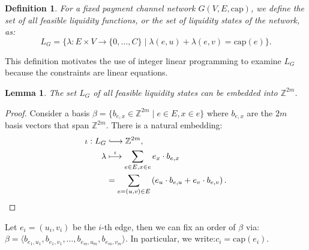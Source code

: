\documentclass[10pt,twocolumn]{article}
\newtheorem{definition}{Definition}[section]
\newtheorem{lemma}[theorem]{Lemma}
\newcommand{\longhookrightarrow}{\lhook\joinrel\longrightarrow}
\begin{document}


\begin{definition}
For a fixed payment channel network \( G(V,E, \text{cap}) \), we define the set of all feasible liquidity functions, or the set of liquidity states of the network, as:
\[ L_G = \{\lambda: E \times V \longrightarrow \{0, \dots, C\} \mid \lambda(e,u) + \lambda(e,v) = \text{cap}(e) \}. \]
\end{definition}
This definition motivates the use of integer linear programming to examine \(L_G\) because the constraints are linear equations.
\begin{lemma}
The set \( L_G \) of all feasible liquidity states can be embedded into \(\mathbb{Z}^{2m}\).
\end{lemma}

\begin{proof}
Consider a basis \( \beta = \{ b_{e,x} \in \mathbb{Z}^{2m} \mid e \in E, x \in e \} \) where \( b_{e,x} \) are the \(2m\) basis vectors that span \(\mathbb{Z}^{2m}\). There is a natural embedding:
\[
\begin{aligned}
\iota: L_G & \longhookrightarrow \mathbb{Z}^{2m}, \\
\lambda & \stackrel{\iota}{\longmapsto} \sum_{e \in E, x \in e} e_x \cdot b_{e,x} \\
& = \sum_{e=(u,v) \in E} \left( e_u \cdot b_{e,u} + e_v \cdot b_{e,v} \right).
\end{aligned}
\]
\end{proof}

Let \( e_i = (u_i, v_i) \) be the \( i \)-th edge, then we can fix an order of \( \beta \) via:
\( \beta = \langle b_{e_1, u_1}, b_{e_1, v_1}, \dots, b_{e_m, u_m}, b_{e_m, v_m} \rangle. \)
In particular, we write:\( c_i = \text{cap}(e_i). \)
\end{document}
